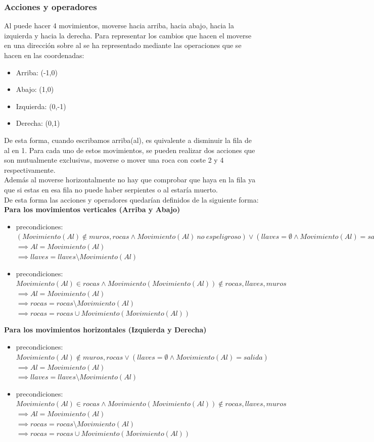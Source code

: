 \documentclass[11pt,spanish]{article}
\begin{document}
			\subsubsection{Acciones y operadores}
			Al puede hacer 4 movimientos, moverse hacia arriba, hacia abajo, hacia la izquierda y hacia la derecha. Para representar los cambios que hacen el moverse en una dirección sobre al se ha representado mediante las operaciones que se hacen en las coordenadas:
			\begin{itemize}
				\item Arriba: (-1,0)
				\item Abajo: (1,0)
				\item Izquierda: (0,-1)
				\item Derecha: (0,1)
			\end{itemize}
			De esta forma, cuando escribamos arriba(al), es quivalente a disminuir la fila de al en 1.
			Para cada uno de estos movimientos, se pueden realizar dos acciones que son mutualmente exclusivas, moverse o mover una roca con coste 2 y 4 respectivamente.\\
			Además al moverse horizontalmente no hay que comprobar que haya en la fila ya que si estas en esa fila no puede haber serpientes o al estaría muerto.\\
			De esta forma las acciones y operadores quedarían definidos de la siguiente forma:\\
			\textbf{Para los movimientos verticales (Arriba y Abajo)}
			\begin{itemize}
				\item precondiciones: $(Movimiento(Al) \notin muros, rocas \land Movimiento(Al)\ no\ es peligroso) \lor (llaves = \emptyset \land Movimiento(Al) = salida)$\\
				$\implies Al = Movimiento(Al)$\\
				$\implies llaves = llaves\setminus Movimiento(Al)$
				\item precondiciones: $Movimiento(Al) \in rocas \land Movimiento(Movimiento(Al)) \notin rocas, llaves, muros$\\
				$\implies Al = Movimiento(Al)$\\
				$\implies rocas = rocas\setminus Movimiento(Al)$\\
				$\implies rocas = rocas \cup Movimiento(Movimiento(Al))$
			\end{itemize}
			\textbf{Para los movimientos horizontales (Izquierda y Derecha)}
			\begin{itemize}
				\item precondiciones: $Movimiento(Al) \notin muros, rocas \lor (llaves = \emptyset \land Movimiento(Al) = salida)$\\
				$\implies Al = Movimiento(Al)$\\
				$\implies llaves = llaves\setminus Movimiento(Al)$
				\item precondiciones: $Movimiento(Al) \in rocas \land Movimiento(Movimiento(Al)) \notin rocas, llaves, muros$\\
				$\implies Al = Movimiento(Al)$\\
				$\implies rocas = rocas\setminus Movimiento(Al)$\\
				$\implies rocas = rocas \cup Movimiento(Movimiento(Al))$
			\end{itemize}
\end{document}
